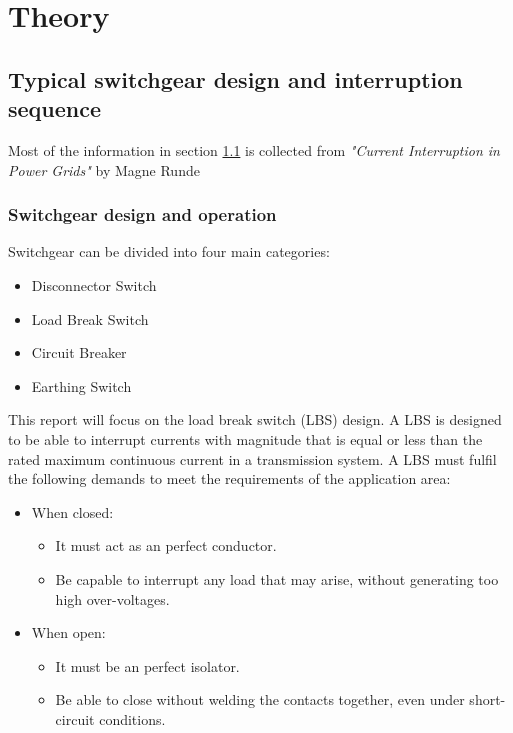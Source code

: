 \documentclass[10pt,a4paper,twoside]{article}
\begin{document}

\cleardoublepage

\section{Theory}
\subsection{Typical switchgear design and interruption sequence} \label{sec:genDes}
Most of the information in section \ref{sec:genDes} is collected from \textit{"Current Interruption in Power Grids"} by Magne Runde \cite{bib:HVEbreak} \newline

\subsubsection{Switchgear design and operation} \label{sec:InterruptCurrent}
Switchgear can be divided into four main categories:
\begin{itemize}
\item Disconnector Switch
\item Load Break Switch
\item Circuit Breaker
\item Earthing Switch
\end{itemize}
This report will focus on the load break switch (LBS) design. A LBS is designed to be able to interrupt currents with magnitude that is equal or less than the rated maximum continuous current in a transmission system. A LBS must fulfil the following demands to meet the requirements of the application area:

\begin{itemize}
\item When closed:
	\begin{itemize}
		\item It must act as an perfect conductor.
		\item Be capable to interrupt any load that may arise, without generating too high over-voltages. 
	\end{itemize}
\item When open:
	\begin{itemize}
		\item It must be an perfect isolator.
		\item Be able to close without welding the contacts together, even under short-circuit conditions.
	\end{itemize}
\end{itemize}
\end{document}

